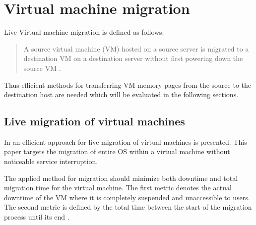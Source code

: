 \section{Virtual machine migration}


Live Virtual machine migration is defined as follows:
\begin{quote}
A source virtual machine (VM) hosted on a source server is
migrated to a destination VM on a destination server without
first powering down the source VM \cite{nelson2009virtual}.
\end{quote}

Thus efficient methods for transferring VM memory pages from the source to the destination host are needed which will be evaluated in the following sections. 
%


\subsection{Live migration of virtual machines}

In \cite{clark2005live} an efficient approach for live migration of virtual machines is presented. This paper targets the migration of entire OS within a virtual machine without noticeable service interruption. 

The applied method for migration should minimize both downtime and total migration time for the virtual machine. The first metric denotes the actual downtime of the VM where it is completely suspended and unaccessible to users. The second metric is defined by the total time between the start of the migration process until its end \cite{clark2005live}. 

